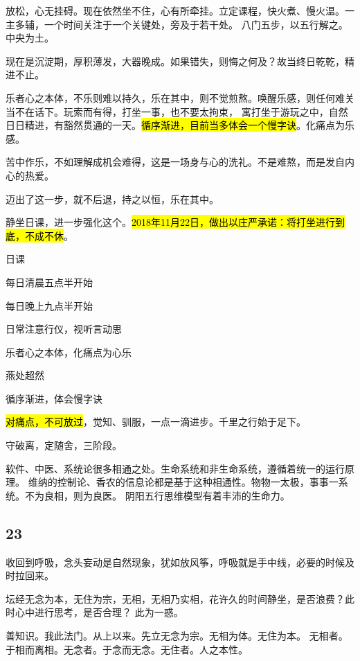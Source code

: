 放松，心无挂碍。现在依然坐不住，心有所牵挂。立定课程，快火煮、慢火温。一主多辅，一个时间关注于一个关键处，旁及于若干处。
八门五步，以五行解之。中央为土。

现在是沉淀期，厚积薄发，大器晚成。如果错失，则悔之何及？故当终日乾乾，精进不止。

乐者心之本体，不乐则难以持久，乐在其中，则不觉煎熬。唤醒乐感，则任何难关当不在话下。玩索而有得，打坐一事，也不要太拘束，
寓打坐于游玩之中，自然日日精进，有豁然贯通的一天。\hl{循序渐进，目前当多体会一个慢字诀}。化痛点为乐感。

苦中作乐，不如理解成机会难得，这是一场身与心的洗礼。不是难熬，而是发自内心的热爱。

迈出了这一步，就不后退，持之以恒，乐在其中。

静坐日课，进一步强化这个。\hl{2018年11月22日，做出以庄严承诺：将打坐进行到底，不成不休}。

日课
\begin{enumbox}
\item 每日清晨五点半开始
\item 每日晚上九点半开始
\item 日常注意行仪，视听言动思
\item 乐者心之本体，化痛点为心乐
\item 燕处超然
\item 循序渐进，体会慢字诀
\item \hl{对痛点，不可放过}，觉知、驯服，一点一滴进步。千里之行始于足下。
\end{enumbox}

守破离，定随舍，三阶段。

软件、中医、系统论很多相通之处。生命系统和非生命系统，遵循着统一的运行原理。
维纳的控制论、香农的信息论都是基于这种相通性。物物一太极，事事一系统。不为良相，则为良医。
阴阳五行思维模型有着丰沛的生命力。

\subsection{23}

收回到呼吸，念头妄动是自然现象，犹如放风筝，呼吸就是手中线，必要的时候及时拉回来。

坛经无念为本，无住为宗，无相，无相乃实相，花许久的时间静坐，是否浪费？此时心中进行思考，是否合理？
此为一惑。

\begin{shadequote}
善知识。我此法门。从上以来。先立无念为宗。无相为体。无住为本。
无相者。于相而离相。无念者。于念而无念。无住者。人之本性。
\end{shadequote}

